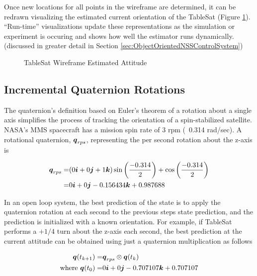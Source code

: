 Once new locations for all points in the wireframe are determined, it can be redrawn visualizing the estimated current orientation of the TableSat (Figure \ref{fig:TSatWireframeEstimatedAttitude}).  ``Run-time'' visualizations update these representations as the simulation or experiment is occuring and shows how well the estimator runs dynamically. (discussed in greater detail in Section \ref{sec:ObjectOrientedNSSControlSystem})

\begin{figure}[H]
  \centerline{}
  \caption{TableSat Wireframe Estimated Attitude}
  \label{fig:TSatWireframeEstimatedAttitude}
\end{figure}


\subsection{Incremental Quaternion Rotations}
\label{subsubsec:IncrementalQuaternionRotations}

The quaternion's definition based on Euler's theorem of a rotation about a single axis simplifies the process of tracking the orientation of a spin-stabilized satellite.  NASA's MMS spacecraft has a mission spin rate of 3 rpm (~0.314 rad/sec).  A rotational quaternion, $\boldsymbol{q}_{rps}$, representing the per second rotation about the z-axis is

\begin{equation}
  \begin{aligned}
    \boldsymbol{q}_{rps} = & ( 0\boldsymbol{i} + 0\boldsymbol{j} + 1\boldsymbol{k} ) \sin \left( \frac{-0.314}{2} \right) + \cos \left( \frac{-0.314}{2} \right) \\
    = & 0\boldsymbol{i} +0\boldsymbol{j} -0.156434\boldsymbol{k} + 0.987688
  \end{aligned}
\end{equation}

In an open loop system, the best prediction of the state is to apply the quaternion rotation at each second to the previous steps state prediction, and the prediction is initialized with a known orientation.  For example, if TableSat performs a $+1/4$ turn about the z-axis each second, the best prediction at the current attitude can be obtained using just a quaternion multiplication as follows

\begin{equation}
  \begin{aligned}
    \boldsymbol{q}(t_{k+1}) = & \boldsymbol{q}_{rps} \otimes \boldsymbol{q}(t_{k}) \\
    \text{where } \boldsymbol{q}(t_0) = & 0 \boldsymbol{i} +0 \boldsymbol{j} -0.707107 \boldsymbol{k} +0.707107
  \end{aligned}
  \label{eqn:3rpmQuaternionEquation}
\end{equation}

